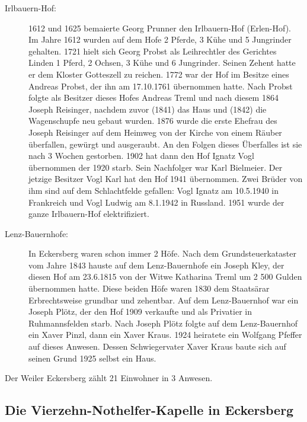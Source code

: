 \documentclass[12pt,a4pager]{book}
\begin{document}
\begin{description}
\item[Irlbauern-Hof:] 1612 und 1625 bemaierte Georg Prunner den Irlbauern-Hof
(Erlen-Hof). Im Jahre 1612 wurden auf dem Hofe 2 Pferde, 3 Kühe und 5 Jungrinder
gehalten. 1721 hielt sich Georg Probst als Leihrechtler des Gerichtes Linden 1
Pferd, 2 Ochsen, 3 Kühe und 6 Jungrinder. Seinen Zehent hatte er dem Kloster
Gotteszell zu reichen. 1772 war der Hof im Besitze eines Andreas Probst, der ihn
am 17.10.1761 übernommen hatte. Nach Probst folgte als Besitzer dieses Hofes
Andreas Treml und nach diesem 1864 Joseph Reisinger, nachdem zuvor (1841) das
Haus und (1842) die Wagenschupfe neu gebaut wurden. 1876 wurde die erste Ehefrau
des Joseph Reisinger auf dem Heimweg von der Kirche von einem Räuber überfallen,
gewürgt und ausgeraubt. An den Folgen dieses Überfalles ist sie nach 3 Wochen
gestorben. 1902 hat dann den Hof Ignatz Vogl übernommen der 1920 starb. Sein
Nachfolger war Karl Bielmeier. Der jetzige Besitzer Vogl Karl hat den Hof 1941
übernommen. Zwei Brüder von ihm sind auf dem Schlachtfelde gefallen: Vogl Ignatz
am 10.5.1940 in Frankreich und Vogl Ludwig am 8.1.1942 in Russland. 1951 wurde
der ganze Irlbauern-Hof elektrifiziert.

\item[Lenz-Bauernhofe:] In Eckersberg waren schon immer 2 Höfe. Nach dem
Grundsteuerkataster vom Jahre 1843 hauste auf dem Lenz-Bauernhofe ein Joseph
Kley, der diesen Hof am 23.6.1815 von der Witwe Katharina Treml um 2 500 Gulden
übernommen hatte. Diese beiden Höfe waren 1830 dem Staatsärar Erbrechtsweise
grundbar und zehentbar. Auf dem Lenz-Bauernhof war ein Joseph Plötz, der den Hof
1909 verkaufte und als Privatier in Ruhmannsfelden starb. Nach Joseph Plötz
folgte auf dem Lenz-Bauernhof ein Xaver Pinzl, dann ein Xaver Kraus. 1924
heiratete ein Wolfgang Pfeffer auf dieses Anwesen. Dessen Schwiegervater Xaver
Kraus baute sich auf seinen Grund 1925 selbst ein Haus.
\end{description}

Der Weiler Eckersberg zählt 21 Einwohner in 3 Anwesen.

\subsection{Die Vierzehn-Nothelfer-Kapelle in Eckersberg}
\end{document}
